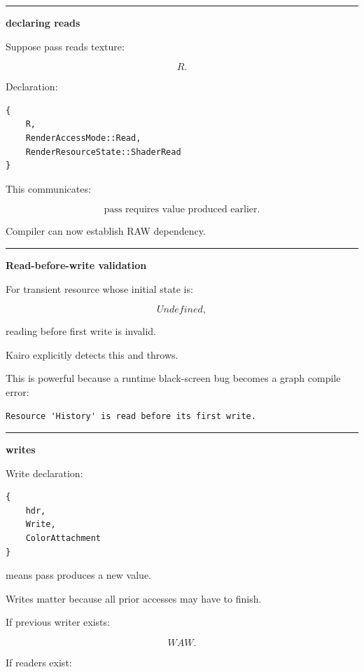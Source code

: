 \begin{center}\rule{0.5\linewidth}{0.5pt}\end{center}

\textbf{declaring reads}

Suppose pass reads texture:

\[
R.
\]

Declaration:

\begin{verbatim}
{
    R,
    RenderAccessMode::Read,
    RenderResourceState::ShaderRead
}
\end{verbatim}

This communicates:

\[
\boxed{
\text{pass requires value produced earlier}.
}
\]

Compiler can now establish RAW dependency.

\begin{center}\rule{0.5\linewidth}{0.5pt}\end{center}

\textbf{Read-before-write validation}

For transient resource whose initial state is:

\[
Undefined,
\]

reading before first write is invalid.

Kairo explicitly detects this and throws.

This is powerful because a runtime black-screen bug becomes a graph compile error:

\begin{verbatim}
Resource 'History' is read before its first write.
\end{verbatim}

\begin{center}\rule{0.5\linewidth}{0.5pt}\end{center}

\textbf{writes}

Write declaration:

\begin{verbatim}
{
    hdr,
    Write,
    ColorAttachment
}
\end{verbatim}

means pass produces a new value.

Writes matter because all prior accesses may have to finish.

If previous writer exists:

\[
WAW.
\]

If readers exist:


